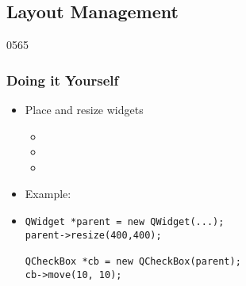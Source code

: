 %
%
%
%

\subsection{Layout Management}

\begin{slide}[fragile]{0565}
\frametitle{Doing it Yourself}
\label{geometry_management}
\begin{itemize}
  \item Place and resize widgets
    \begin{itemize}
      \item {}
      \item {}
      \item {}
    \end{itemize}
    
  \item Example: 
  \item[] \begin{lstlisting}
QWidget *parent = new QWidget(...);
parent->resize(400,400);

QCheckBox *cb = new QCheckBox(parent);
cb->move(10, 10);
  \end{lstlisting}
  \end{itemize}
\end{slide}
